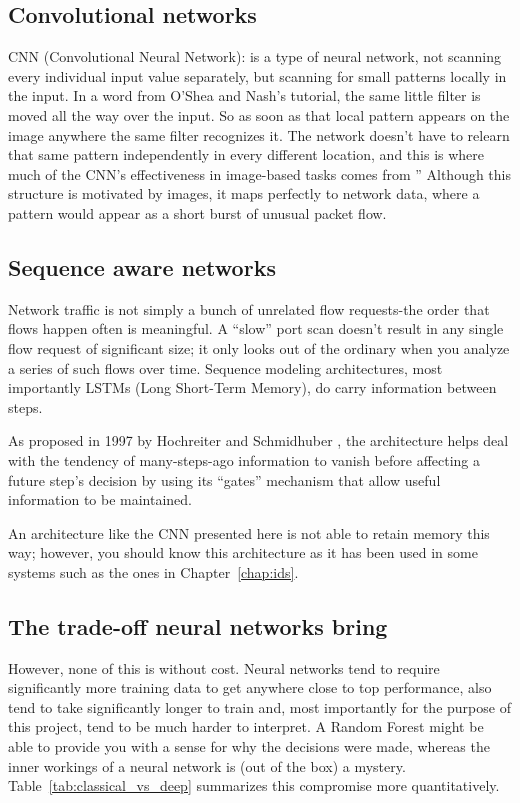 \subsection{Convolutional networks}
 
CNN (Convolutional Neural Network): is a type of neural network, not scanning every individual input value separately, but scanning for small patterns locally in the input. In a word from O'Shea and Nash's tutorial, the same little filter is moved all the way over the input. So as soon as that local pattern appears on the image anywhere the same filter recognizes it. The network doesn't have to relearn that same pattern independently in every different location, and this is where much of the CNN’s effectiveness in image-based tasks comes from \cite{oshea2015cnn}” Although this structure is motivated by images, it maps perfectly to network data, where a pattern would appear as a short burst of unusual packet flow.

\subsection{Sequence aware networks}
 
Network traffic is not simply a bunch of unrelated flow requests-the order that flows happen often is meaningful. A “slow” port scan doesn’t result in any single flow request of significant size; it only looks out of the ordinary when you analyze a series of such flows over time. Sequence modeling architectures, most importantly LSTMs (Long Short-Term Memory), do carry information between steps. 

As proposed in 1997 by Hochreiter and Schmidhuber \cite{hochreiter1997lstm}, the architecture helps deal with the tendency of many-steps-ago information to vanish before affecting a future step’s decision by using its “gates” mechanism that allow useful information to be maintained. 

An architecture like the CNN presented here is not able to retain memory this way; however, you should know this architecture as it has been used in some systems such as the ones in Chapter~\ref{chap:ids}.

\subsection{The trade-off neural networks bring}
 
However, none of this is without cost. Neural networks tend to require significantly more training data to get anywhere close to top performance, also tend to take significantly longer to train and, most importantly for the purpose of this project, tend to be much harder to interpret. A Random Forest might be able to provide you with a sense for why the decisions were made, whereas the inner workings of a neural network is (out of the box) a mystery. Table~\ref{tab:classical_vs_deep} summarizes this compromise more quantitatively.
 
